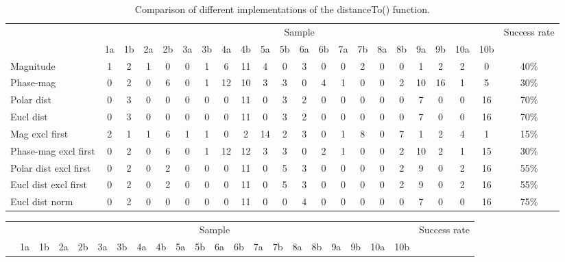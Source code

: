 \documentclass[a4paper,12pt]{article}
\begin{document}
\begin{landscape}
	\begin{table}[p]
		\centering
		\begin{tabular}{|l|c@{ }c|c@{ }c|c@{ }c|c@{ }c|c@{ }c|c@{ }c|c@{ }c|c@{ }c|c@{ }c|c@{ }c|c|}
			\hline
			& \multicolumn{20}{|c|}{Sample} & Success rate \\
			& 1a & 1b & 2a & 2b & 3a & 3b & 4a & 4b & 5a & 5b & 6a & 6b & 7a & 7b & 8a & 8b & 9a & 9b & 10a & 10b & \\
			
			\hline
			Magnitude                  & 1 & 2 & 1 & 0 & 0 & 1 & 6 & 11 & 4 & 0 & 3 & 0 & 0 & 2 & 0 & 0 & 1 & 2 & 2 & 0 & 40\% \\
			Phase-mag                  & 0 & 2 & 0 & 6 & 0 & 1 & 12 & 10 & 3 & 3 & 0 & 4 & 1 & 0 & 0 & 2 & 10 & 16 & 1 & 5 & 30\% \\
			Polar dist                 & 0 & 3 & 0 & 0 & 0 & 0 & 0 & 11 & 0 & 3 & 2 & 0 & 0 & 0 & 0 & 0 & 7 & 0 & 0 & 16 & 70\% \\
			Eucl dist                  & 0 & 3 & 0 & 0 & 0 & 0 & 0 & 11 & 0 & 3 & 2 & 0 & 0 & 0 & 0 & 0 & 7 & 0 & 0 & 16 & 70\% \\
			
			\hline
			Mag excl first             & 2 & 1 & 1 & 6 & 1 & 1 & 0 & 2 & 14 & 2 & 3 & 0 & 1 & 8 & 0 & 7 & 1 & 2 & 4 & 1 & 15\% \\
			Phase-mag excl first       & 0 & 2 & 0 & 6 & 0 & 1 & 12 & 12 & 3 & 3 & 0 & 2 & 1 & 0 & 0 & 2 & 10 & 2 & 1 & 15 & 30\% \\
			Polar dist excl first      & 0 & 2 & 0 & 2 & 0 & 0 & 0 & 11 & 0 & 5 & 3 & 0 & 0 & 0 & 0 & 2 & 9 & 0 & 2 & 16 & 55\% \\
			Eucl dist excl first       & 0 & 2 & 0 & 2 & 0 & 0 & 0 & 11 & 0 & 5 & 3 & 0 & 0 & 0 & 0 & 2 & 9 & 0 & 2 & 16 & 55\% \\
			
			\hline
			Eucl dist norm             & 0 & 2 & 0 & 0 & 0 & 0 & 0 & 11 & 0 & 0 & 4 & 0 & 0 & 0 & 0 & 0 & 7 & 0 & 0 & 16 & 75\% \\
			
			\hline
		\end{tabular}
		\caption{Comparison of different implementations of the distanceTo() function.}
		\label{ClassificationResults}
	\end{table}
	
	\begin{table}[p]
		\centering
		\begin{tabular}{|l|c@{ }c|c@{ }c|c@{ }c|c@{ }c|c@{ }c|c@{ }c|c@{ }c|c@{ }c|c@{ }c|c@{ }c|c|}
			\hline
			& \multicolumn{20}{|c|}{Sample} & Success rate \\
			& 1a & 1b & 2a & 2b & 3a & 3b & 4a & 4b & 5a & 5b & 6a & 6b & 7a & 7b & 8a & 8b & 9a & 9b & 10a & 10b & \\
			

\end{tabular}
\end{table}
\end{landscape}
\end{document}
